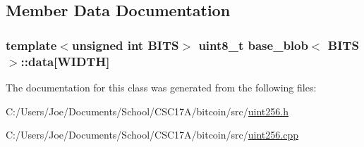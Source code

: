 \subsection{Member Data Documentation}
\hypertarget{classbase__blob_a667a178269121efb4ec95bd59e6a9615}{}
\subsubsection[{data}]{\setlength{\rightskip}{0pt plus 5cm}template$<$unsigned int B\+I\+T\+S$>$ uint8\+\_\+t {\bf base\+\_\+blob}$<$ B\+I\+T\+S $>$\+::data\mbox{[}{\bf W\+I\+D\+T\+H}\mbox{]}\hspace{0.3cm}{\ttfamily [protected]}}\label{classbase__blob_a667a178269121efb4ec95bd59e6a9615}


The documentation for this class was generated from the following files\+:\begin{DoxyCompactItemize}
\item 
C\+:/\+Users/\+Joe/\+Documents/\+School/\+C\+S\+C17\+A/bitcoin/src/\hyperlink{uint256_8h}{uint256.\+h}\item 
C\+:/\+Users/\+Joe/\+Documents/\+School/\+C\+S\+C17\+A/bitcoin/src/\hyperlink{uint256_8cpp}{uint256.\+cpp}\end{DoxyCompactItemize}
